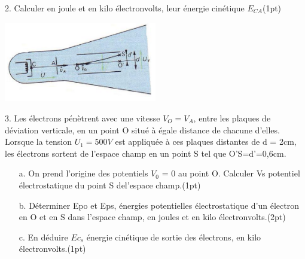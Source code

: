 \documentclass[12pt]{article}
\begin{document}
2. Calculer en joule et en kilo électronvolts, leur énergie cinétique $E_{CA}$\dotfill(1pt)
   \begin{center}
    \includegraphics[width=0.5\textwidth]{./img/img_02.png}
      \end{center}
   3. Les électrons pénètrent avec une vitesse $V_O = V_A$, entre les plaques de déviation verticale, en un point O
situé à égale distance de chacune d’elles. Lorsque la tension $U_1 = 500V$ est appliquée à ces plaques
distantes de d = 2cm, les électrons sortent de l’espace champ en un point S tel que O’S=d’=0,6cm.
   \begin{enumerate}
     \item[a.] On prend l’origine des potentiels $V_0$ = 0 au point O. Calculer Vs potentiel électrostatique du point S del’espace champ.\dotfill(1pt)

     \item[b.] Déterminer Epo et Eps, énergies potentielles électrostatique d’un électron en O et en S dans l’espace champ, en joules et en kilo électronvolts.\dotfill(2pt)

     \item[c.] En déduire $Ec_s$ énergie cinétique de sortie des électrons, en kilo électronvolts.\dotfill(1pt)
   \end{enumerate}
\end{document}
